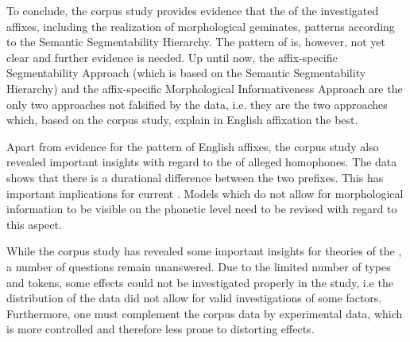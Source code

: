  To conclude, the corpus study provides evidence that the  of the investigated affixes, including the realization of morphological geminates, patterns according to the Semantic Segmentability Hierarchy. The pattern of  is, however, not yet clear and further evidence is needed. 
 Up until now, the affix-specific Segmentability Approach (which is based on the Semantic Segmentability Hierarchy) and the affix-specific Morphological Informativeness Approach are the only two approaches not falsified by the data, i.e. they are the two approaches which, based on the corpus study, explain  in English affixation the best.


Apart from evidence for the  pattern of English affixes, the corpus study also revealed important insights with regard to the  of alleged homophones. The data shows that there is a durational difference between the two prefixes. This has important implications for current . Models which do not allow for morphological information to be visible on the phonetic level need to be revised with regard to this aspect.



While the corpus study has revealed some important insights for theories of the , a number of questions remain  unanswered. Due to the limited number of types and tokens, some effects could not be investigated properly in the study, i.e the distribution of the data did not allow for valid investigations of some factors. Furthermore, one must complement the corpus data by experimental data, which is more controlled and therefore less prone to distorting effects.
